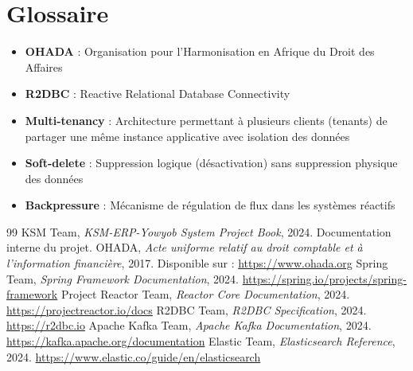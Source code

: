\documentclass[12pt]{report}
\begin{document}
\section{Glossaire}
\begin{itemize}
    \item \textbf{OHADA} : Organisation pour l'Harmonisation en Afrique du Droit des Affaires
    \item \textbf{R2DBC} : Reactive Relational Database Connectivity
    \item \textbf{Multi-tenancy} : Architecture permettant à plusieurs clients (tenants) de partager une même instance applicative avec isolation des données
    \item \textbf{Soft-delete} : Suppression logique (désactivation) sans suppression physique des données
    \item \textbf{Backpressure} : Mécanisme de régulation de flux dans les systèmes réactifs
\end{itemize}

\begin{thebibliography}{99}
 KSM Team, \textit{KSM-ERP-Yowyob System Project Book}, 2024. Documentation interne du projet.
 OHADA, \textit{Acte uniforme relatif au droit comptable et à l'information financière}, 2017. Disponible sur : \url{https://www.ohada.org}
 Spring Team, \textit{Spring Framework Documentation}, 2024. \url{https://spring.io/projects/spring-framework}
 Project Reactor Team, \textit{Reactor Core Documentation}, 2024. \url{https://projectreactor.io/docs}
 R2DBC Team, \textit{R2DBC Specification}, 2024. \url{https://r2dbc.io}
 Apache Kafka Team, \textit{Apache Kafka Documentation}, 2024. \url{https://kafka.apache.org/documentation}
 Elastic Team, \textit{Elasticsearch Reference}, 2024. \url{https://www.elastic.co/guide/en/elasticsearch}
\end{thebibliography}
\end{document}
